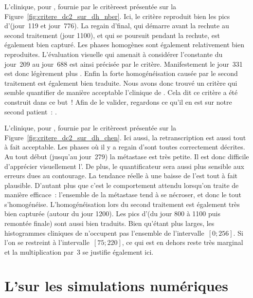 \documentclass[main.tex]{subfiles}
\begin{document}
L'\hetero clinique, pour \Nber, fournie par le critère\HH est présentée sur la Figure~\ref{fig:critere_dc2_sur_dh_nber}. Ici, le critère reproduit bien les pics d'\heteros (jour~119 et jour~776). La regain d'\hetero final, qui démarre avant la rechute au second traitement (jour 1100), et qui se poursuit pendant la rechute, est également bien capturé. Les phases homogènes sont également relativement bien reproduites. L'évaluation visuelle qui amenait à considérer l'\hetero constante du jour~209 au jour~688 est ainsi précisée par le critère. Manifestement le jour~331 est donc légèrement plus \heterogene. 
Enfin la forte homogénéisation causée par le second traitement est également bien traduite. 
Nous avons donc trouvé un critère qui semble quantifier de manière acceptable l'\hetero clinique de \Nber. Cela dit ce critère a été construit dans ce but~! Afin de le valider, regardons ce qu'il en est sur notre second patient~: \Chen.


L'\hetero clinique, pour \Chen, fournie par le critère\HH est présentée sur la Figure~\ref{fig:critere_dc2_sur_dh_chen}. Ici aussi, la retranscription est aussi tout à fait acceptable. Les phases où il y a regain d'\hetero sont toutes correctement décrites. Au tout début (jusqu'au jour~279) la métastase est très petite. Il est donc difficile d'apprécier visuellement l'\hetero. De plus, le quantificateur sera aussi plus sensible aux erreurs dues au contourage. La tendance réelle à une baisse de l'\hetero est tout à fait plausible. D'autant plus que c'est le comportement attendu lorsqu'on traite de manière efficace~: l'ensemble de la métastase tend à se nécroser, et donc le tout s'homogénéise. 
L'homogénéisation lors du second traitement est également très bien capturée (autour du jour 1200). 
Les pics d'\hetero (du jour 800 à 1100 puis remontée finale) sont aussi bien traduits. 
Bien qu'étant plus larges, les histogrammes cliniques de \Chen n'occupent pas l'ensemble de l'intervalle~$[0;256]$. Si l'on se restreint à l'intervalle~$[75;220]$, ce qui est en dehors reste très marginal et la multiplication par~3 se justifie également ici. 


\section{L'\hetero sur les simulations numériques}
\end{document}
